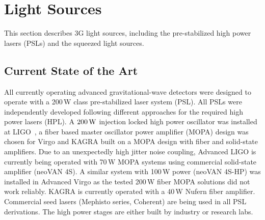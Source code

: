 
\chapter{Light Sources}
\label{sec:Light_sources}

This section describes 3G light sources, including the pre-stabilized high power lasers (PSLs) and the squeezed light sources. 

\section{Current State of the Art}
All currently operating advanced gravitational-wave detectors were designed to operate with a 200\,W class pre-stabilized laser system (PSL). All PSLs were independently developed following different approaches for the required high power lasers (HPL). A $ 200\,{\rm W} $ injection locked high power oscillator was installed at LIGO~\cite{Kwee:12}, a fiber based master oscillator power amplifier (MOPA) design was chosen for Virgo and KAGRA built on a MOPA design with fiber and solid-state amplifiers. Due to an unexpectedly high jitter noise coupling, Advanced LIGO is currently being operated with 70\,W MOPA systems using commercial solid-state amplifier (neoVAN 4S). A similar system with 100\,W power (neoVAN 4S-HP) was installed in Advanced Virgo as the tested 200\,W fiber MOPA solutions did not work reliably. KAGRA is currently operated with a 40\,W Nufern fiber amplifier. Commercial seed lasers (Mephisto series, Coherent) are being used in all PSL derivations. The high power stages are either built by industry or research labs. 

